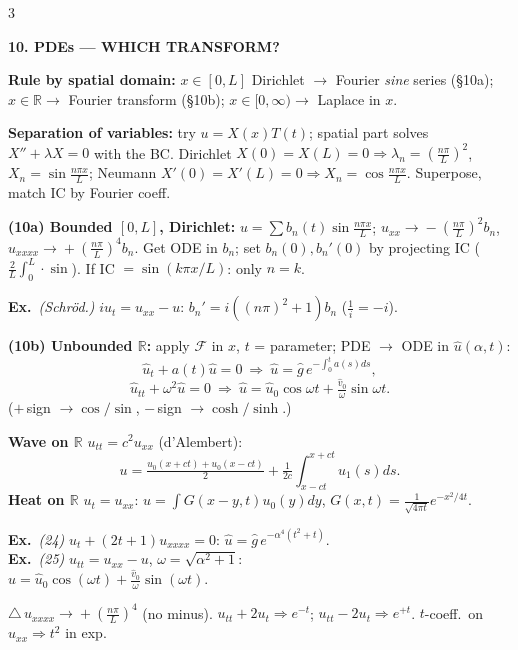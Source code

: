 \documentclass[a4paper,8pt]{extarticle}
\newcommand{\topic}[2]{%
  \vspace{4.5pt}%
  {\colorbox{#1}{\parbox{\dimexpr\columnwidth-2\fboxsep}{\color{white}\bfseries\footnotesize #2}}}\par\vspace{2.5pt}}
\newcommand{\warn}{\textcolor{cWarn}{\textbf{\textwarning\,}}}
\newcommand{\textwarning}{$\triangle$}
\newcommand{\exo}{\textbf{\textcolor{cA}{Ex.}}\ }
\newcommand{\R}{\mathbb{R}}
\newcommand{\Fou}{\mathcal{F}}
\newcommand{\To}{\!\to\!}
\begin{document}
\begin{multicols}{3}
\topic{cC}{10. PDEs — WHICH TRANSFORM?}
\textbf{Rule by spatial domain:} $x\in[0,L]$ Dirichlet $\To$ Fourier \emph{sine} series (\S10a); $x\in\R\To$ Fourier transform (\S10b); $x\in[0,\infty)\To$ Laplace in $x$.\\
\begin{thm}\textbf{Separation of variables:} try $u{=}X(x)T(t)$; spatial part solves $X''{+}\lambda X{=}0$ with the BC. Dirichlet $X(0){=}X(L){=}0\Rightarrow\lambda_n{=}(\tfrac{n\pi}L)^2$, $X_n{=}\sin\tfrac{n\pi x}L$; Neumann $X'(0){=}X'(L){=}0\Rightarrow X_n{=}\cos\tfrac{n\pi x}L$. Superpose, match IC by Fourier coeff.\end{thm}
\textbf{(10a) Bounded $[0,L]$, Dirichlet:} $u{=}\sum b_n(t)\sin\frac{n\pi x}L$; $u_{xx}{\To}{-}(\frac{n\pi}L)^2b_n$, $u_{xxxx}{\To}{+}(\frac{n\pi}L)^4b_n$. Get ODE in $b_n$; set $b_n(0),b_n'(0)$ by projecting IC ($\frac2L\int_0^L\!\cdot\sin$). If IC $=\sin(k\pi x/L)$: only $n{=}k$.
\begin{ex}\exo \emph{(Schröd.)} $iu_t{=}u_{xx}{-}u$: $b_n'{=}i((n\pi)^2{+}1)b_n$ ($\frac1i{=}{-}i$).\end{ex}
\textbf{(10b) Unbounded $\R$:} apply $\Fou$ in $x$, $t$ = parameter; PDE $\to$ ODE in $\hat u(\alpha,t)$:
\[ \hat u_t{+}a(t)\hat u{=}0\ \Rightarrow\ \hat u{=}\hat g\,e^{-\int_0^t a(s)ds},\]
\[ \hat u_{tt}{+}\omega^2\hat u{=}0\ \Rightarrow\ \hat u{=}\hat u_0\cos\omega t{+}\tfrac{\hat v_0}\omega\sin\omega t.\]
($+\,$sign $\to\cos/\sin$, $-\,$sign $\to\cosh/\sinh$.)
\begin{thm}
\textbf{Wave on $\R$} $u_{tt}{=}c^2u_{xx}$ (d'Alembert):
\[ u{=}\tfrac{u_0(x{+}ct){+}u_0(x{-}ct)}2{+}\tfrac1{2c}\!\int_{x-ct}^{x+ct}\!\!u_1(s)ds.\]
\textbf{Heat on $\R$} $u_t{=}u_{xx}$: $u{=}\!\int G(x{-}y,t)u_0(y)dy$, $G(x,t){=}\tfrac1{\sqrt{4\pi t}}e^{-x^2/4t}$.
\end{thm}
\begin{ex}
\exo \emph{(24)} $u_t{+}(2t{+}1)u_{xxxx}{=}0$: $\hat u{=}\hat g\,e^{-\alpha^4(t^2+t)}$.\\
\exo \emph{(25)} $u_{tt}{=}u_{xx}{-}u$, $\omega{=}\sqrt{\alpha^2{+}1}$:\\ $\hat u{=}\hat u_0\cos(\omega t){+}\frac{\hat v_0}{\omega}\sin(\omega t)$.
\end{ex}
\begin{tip}\warn $u_{xxxx}{\To}{+}(\frac{n\pi}L)^4$ (no minus). $u_{tt}{+}2u_t\Rightarrow e^{-t}$; $u_{tt}{-}2u_t\Rightarrow e^{+t}$. $t$-coeff.\ on $u_{xx}\Rightarrow t^2$ in exp.\end{tip}


\end{multicols}
\end{document}
